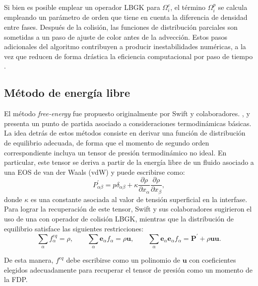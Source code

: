 Si bien es posible emplear un operador LBGK para $\Omega_i^c$, el t\'ermino $\Omega_i^p$ se calcula empleando un par\'ametro de orden que tiene en cuenta la diferencia de densidad entre fases. Despu\'es de la colisi\'on, las funciones de distribuci\'on parciales son sometidas a un paso de ajuste de color antes de la advecci\'on. Estos pasos adicionales del algoritmo contribuyen a producir inestabilidades num\'ericas, a la vez que reducen de forma dr\'astica la eficiencia computacional por paso de tiempo \cite{guo_lattice_2013}.

\subsection*{M\'etodo de energ\'ia libre}
El m\'etodo \emph{free-energy} fue propuesto originalmente por Swift y colaboradores. \cite{swift_lattice_1996}, y presenta un punto de partida asociado a consideraciones termodin\'amicas b\'asicas. La idea detr\'as de estos m\'etodos consiste en derivar una funci\'on de distribuci\'on de equilibrio adecuada, de forma que el momento de segundo orden correspondiente incluya un tensor de presi\'on termodin\'amico no ideal. En particular, este tensor se deriva a partir de la energ\'ia libre de un fluido asociado a una EOS de van der Waals (vdW) y puede escribirse como:
\begin{equation}
	P^{'}_{\alpha\beta}=p\delta_{\alpha\beta}+\kappa\dfrac{\partial \rho}{\partial x_{\alpha}}\dfrac{\partial \rho}{\partial x_{\beta}},
\end{equation}
donde $\kappa$ es una constante asociada al valor de tensi\'on superficial en la interfase. Para lograr la recuperaci\'on de este tensor, Swift y sus colaboradores sugirieron el uso de una \lbe{} con operador de colisi\'on LBGK, mientras que la distribuci\'on de equilibrio satisface las siguientes restricciones:
\begin{equation}
	\sum_{\alpha} f_{\alpha}^{eq} = \rho, \qquad \sum_{\alpha} \bm{e}_{\alpha} f_{\alpha}=\rho\bm{u}, \qquad
	\sum_{\alpha} \bm{e}_{\alpha} \bm{e}_{\alpha} f_{\alpha}= \bm{P}^{'}+\rho\bm{u}\bm{u}.
	\label{eq:free_energy+rest}
\end{equation}

De esta manera, $f^{eq}$ debe escribirse como un polinomio de $\bm{u}$ con coeficientes elegidos adecuadamente para recuperar el tensor de presi\'on como un momento de la FDP.


